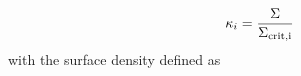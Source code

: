 \begin{equation}
\kappa_i = \frac{\Sigma}{\Sigma_{\rm{crit}, i}}
\end{equation}
with the surface density defined as
  